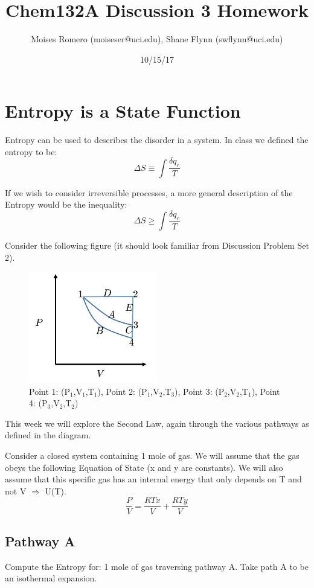 \documentclass{article}
\title{Chem132A Discussion 3 Homework}
\author{Moises Romero (moiseser@uci.edu), Shane Flynn (swflynn@uci.edu) }
\date{10/15/17}
\newcommand{\be}{\begin{equation}}
\newcommand{\ee}{\end{equation}}
\begin{document}
\maketitle

\section{Entropy is a State Function}
Entropy can be used to describes the disorder in a system. 
In class we defined the entropy to be:
\be
\Delta S \equiv \int  \frac{\delta q_{r}}{T}
\ee

If we wish to consider irreversible processes, a more general description of the Entropy would be the inequality: 
\be
\Delta S \geq \int  \frac{\delta q_{r}}{T}
\ee

Consider the following figure (it should look familiar from Discussion Problem Set 2). 
\begin{figure}[h]
\caption{Point 1: (P$_1$,V$_1$,T$_1$), Point 2: (P$_1$,V$_2$,T$_3$), Point 3: (P$_2$,V$_2$,T$_1$), Point 4: (P$_3$,V$_2$,T$_2$)}
\includegraphics[width=0.5\textwidth]{cycle.png}
\end{figure}

This week we will explore the Second Law, again through the various pathways as defined in the diagram.

Consider a closed system containing 1 mole of gas. 
We will assume that the gas obeys the following Equation of State (x and y are constants). 
We will also assume that this specific gas has an internal energy that only depends on T and not V $\Rightarrow$ U(T). 
\be
\frac{P}{V}=\frac{RTx}{V}+\frac{RTy}{V}
\ee

\subsection{Pathway A}
Compute the Entropy for: 1 mole of gas traversing pathway A.
Take path A to be an isothermal expansion. 
\end{document}
